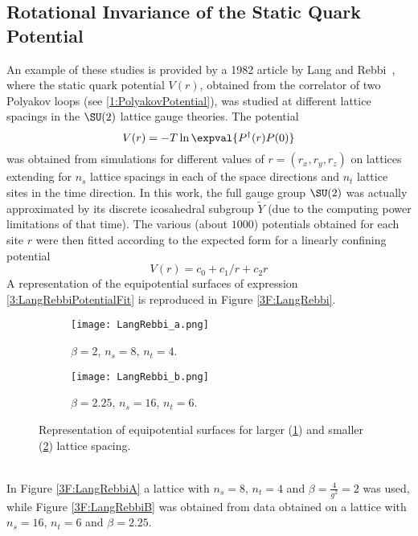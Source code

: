 \subsection{Rotational Invariance of the Static Quark Potential}
An example of these studies is provided by a 1982 article by Lang and Rebbi~\cite{Lang:1982tj}, where the static quark potential $V(r)$, obtained from the correlator of two Polyakov loops (see \eqref{1:PolyakovPotential}), was studied at different lattice spacings in the $\SU(2)$ lattice gauge theories. The potential
\begin{equation}
    V(r) = -T\ln\expval{P^\dagger(r)P(0)} \label{3:LangRebbiPotential}
\end{equation}
was obtained from simulations for different values of $r=(r_x, r_y, r_z)$ on lattices extending for $n_s$ lattice spacings in each of the space directions and $n_t$ lattice sites in the time direction.
In this work, the full gauge group $\SU(2)$ was actually approximated by its discrete icosahedral subgroup $\tilde{Y}$ (due to the computing power limitations of that time).
The various (about $1000$) potentials obtained for each site $r$ were then fitted according to the expected form for a linearly confining potential
\begin{equation}
    V(r) = c_0 + c_1/r + c_2r \label{3:LangRebbiPotentialFit}
\end{equation}
A representation of the equipotential surfaces of expression \eqref{3:LangRebbiPotentialFit} is reproduced in Figure \eqref{3F:LangRebbi}.
\begin{figure}[!htbp]
    \centering
    \hfill
    \begin{subfigure}[b]{0.45\textwidth}
        \centering
        \texttt{[image: LangRebbi\_a.png]}
        \caption{$\beta=2$, $n_s=8$, $n_t=4$.}
        \label{3F:LangRebbiA}
    \end{subfigure}
    \begin{subfigure}[b]{0.45\textwidth}
        \centering
        \texttt{[image: LangRebbi\_b.png]}
        \caption{$\beta=2.25$, $n_s=16$, $n_t=6$.}
        \label{3F:LangRebbiB}
    \end{subfigure}
    \hfill
    \caption{Representation of equipotential surfaces for larger (\ref{3F:LangRebbiA}) and smaller (\ref{3F:LangRebbiB}) lattice spacing.}
    \label{3F:LangRebbi}
\end{figure}\\
In Figure \eqref{3F:LangRebbiA} a lattice with $n_s=8$, $n_t=4$ and $\beta=\frac4{g^2}=2$ was used, while Figure \eqref{3F:LangRebbiB} was obtained from data obtained on a lattice with $n_s=16$, $n_t=6$ and $\beta=2.25$.
